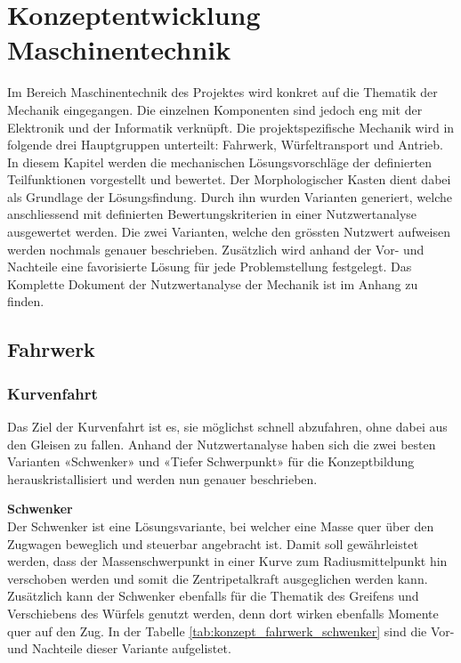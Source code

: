 \documentclass[../../main.tex]{subfiles}
\begin{document}
    \section{Konzeptentwicklung Maschinentechnik}
    Im Bereich Maschinentechnik des Projektes wird konkret auf die Thematik der Mechanik eingegangen. Die einzelnen Komponenten sind jedoch eng mit der Elektronik und der Informatik verknüpft. Die projektspezifische Mechanik wird in folgende drei Hauptgruppen unterteilt: Fahrwerk, Würfeltransport und Antrieb. In diesem Kapitel werden die mechanischen Lösungsvorschläge der definierten Teilfunktionen vorgestellt und bewertet. Der Morphologischer Kasten dient dabei als Grundlage der Lösungsfindung. Durch ihn wurden Varianten generiert, welche anschliessend mit definierten Bewertungskriterien in einer Nutzwertanalyse ausgewertet werden. Die zwei Varianten, welche den grössten Nutzwert aufweisen werden nochmals genauer beschrieben. Zusätzlich wird anhand der Vor- und Nachteile eine favorisierte Lösung für jede Problemstellung festgelegt. Das Komplette Dokument der Nutzwertanalyse der Mechanik ist im Anhang zu finden.

    \subsection{Fahrwerk}
    \subsubsection{Kurvenfahrt}
    Das Ziel der Kurvenfahrt ist es, sie möglichst schnell abzufahren, ohne dabei aus den Gleisen zu fallen. Anhand der Nutzwertanalyse haben sich die zwei besten Varianten «Schwenker» und «Tiefer Schwerpunkt» für die Konzeptbildung herauskristallisiert und werden nun genauer beschrieben.
    
    \textbf{Schwenker}\\
    Der Schwenker ist eine Lösungsvariante, bei welcher eine Masse quer über den Zugwagen beweglich und steuerbar angebracht ist. Damit soll gewährleistet werden, dass der Massenschwerpunkt in einer Kurve zum Radiusmittelpunkt hin verschoben werden und somit die Zentripetalkraft ausgeglichen werden kann. Zusätzlich kann der Schwenker ebenfalls für die Thematik des Greifens und Verschiebens des Würfels genutzt werden, denn dort wirken ebenfalls Momente quer auf den Zug. In der Tabelle \ref{tab:konzept_fahrwerk_schwenker} sind die Vor- und Nachteile dieser Variante aufgelistet.
    
\end{document}

